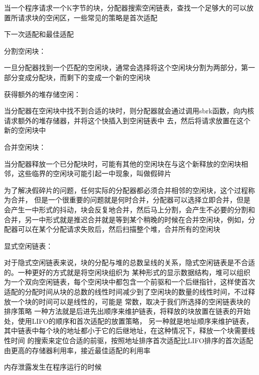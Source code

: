 \documentclass[11pt, a4paper]{article}
\begin{document}
	当一个程序请求一个K字节的块，分配器搜索空闲链表，查找一个足够大的可以放置所请求块的空闲区，一些常见的策略是首次适配
	
	下一次适配和最佳适配

分割空闲块：
	
	一旦分配器找到一个匹配的空闲块，通常会选择将这个空闲块分割为两部分，第一部分变成分配块，而剩下的变成一个新的空闲块

获得额外的堆存储空闲：
	
当分配器在空闲块中找不到合适的块时，则分配器就会通过调用sbrk函数，向内核请求额外的堆存储器，并将这个快插入到空闲链表中
去，然后将请求放置在这个新的空闲块中

合并空闲块：
	
	当分配器释放一个已分配块时，可能有其他的空闲块在与这个新释放的空闲块相邻，这些临界的空闲块可能引起一中现象，叫做假碎片
	
	为了解决假碎片的问题，任何实际的分配器都必须合并相邻的空闲块，这个过程称为合并， 但是一个很重要的问题就是何时合并，分配器可以选择立即合并，但是会产生一中形式的抖动，块会反复地合并，然后马上分割，会产生不必要的分割和合并，另一中形式就是推迟合并就是等到某个稍晚的时候在合并空闲块，例如，分配器可以在某个分配请求失败后，然后扫描整个堆，合并所有的空闲块

显式空闲链表：
	
	对于隐式空闲链表来说，块的分配与堆的总数呈线的关系，隐式空闲链表是不合适的。一种更好的方式就是将空闲块组织为
	某种形式的显示数据结构，堆可以组织为一个双向空闲链表，每个空闲块中都包含一个前驱和一个后继指针，这样使首次
	适配的分配时间从块的总数的线性时间减少到了空闲块的数量的线性时间，不过释放一个块的时间可以是线性的，可能是
	常数，取决于我们所选择的空闲链表块的排序策略
	一种方法就是后进先出顺序来维护链表，将释放的块放置在链表的开始处，使用LIFO的顺序和首次适配的放置策略，
	另一种就是地址顺序来维护链表，其中链表中每个块的地址都小于它的后继地址，在这种情况下，释放一个块需要线性时间
	的搜索来定位合适的前驱，按照地址排序首次适配比LIFO排序的首次适配由更高的存储器利用率，接近最佳适配的利用率

内存泄露发生在程序运行的时候
\end{document}

